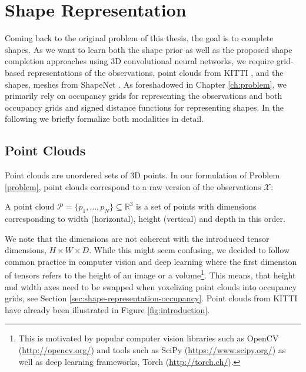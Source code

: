 \chapter{Shape Representation}
\label{ch:shape-representation}

Coming back to the original problem of this thesis, the goal is to complete
shapes. As we want to learn both the shape prior as well as the proposed
shape completion approaches using 3D convolutional neural networks, we require
grid-based representations of the observations, \ie point clouds from KITTI
\cite{GeigerLenzUrtasun:2012,GeigerLenzStillerUrtasun:2013}, and the shapes, \ie
meshes from ShapeNet \cite{ChangFunkhouserGuibasSavarese:2015}.
As foreshadowed in Chapter \ref{ch:problem}, we primarily rely
on occupancy grids for representing the observations and both occupancy
grids and signed distance functions for representing shapes.
In the following we briefly formalize both modalities in detail.

\section{Point Clouds}

Point clouds are unordered sets of 3D points.
In our formulation of Problem \ref{problem}, point clouds correspond
to a raw version of the observations $\mathcal{X}$:

\begin{definition}
  A point cloud $\mathcal{P} = \{p_1, \ldots, p_N\} \subseteq \mathbb{R}^3$ is a
  set of points with dimensions corresponding to width (horizontal),
  height (vertical) and depth in this order.
\end{definition}

We note that the dimensions are not coherent with the introduced tensor dimensions,
\ie $H \times W \times D$. While this might seem confusing, we decided to follow
common practice in computer vision and deep learning where the first
dimension of tensors refers to the height of an image or a volume\footnote{
  This is motivated by popular computer vision libraries such as OpenCV
  (\url{http://opencv.org/}) and tools such as SciPy (\url{https://www.scipy.org/})
  as well as deep learning frameworks, \eg Torch (\url{http://torch.ch/}).
}. This means, that height and width axes need to be swapped when 
voxelizing point clouds into occupancy grids, see Section
\ref{sec:shape-representation-occupancy}. Point clouds from KITTI
have already been illustrated in Figure \ref{fig:introduction}.


